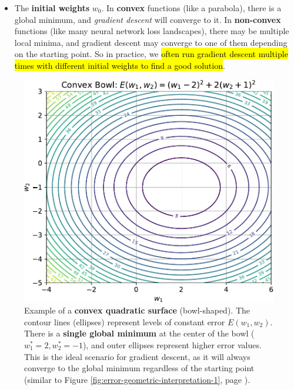 \begin{itemize}
    \item The \textbf{initial weights} $w_{0}$. In \textbf{convex} functions (like a parabola), there is a global minimum, and \emph{gradient descent} will converge to it. In \textbf{non-convex} functions (like many neural network loss landscapes), there may be multiple local minima, and gradient descent may converge to one of them depending on the starting point. So in practice, we \hl{often run gradient descent multiple times with different initial weights to find a good solution}.
\end{itemize}

\begin{figure}[!htp]
    \centering
    \includegraphics[width=.8\textwidth]{img/learning-and-optimization/convex-bowl-contour.pdf}
    \caption{Example of a \textbf{convex quadratic surface} (bowl-shaped). The contour lines (ellipses) represent levels of constant error $E\left(w_{1}, w_{2}\right)$. There is a \textbf{single global minimum} at the center of the bowl ($w_{1}^{*} = 2, w_{2}^{*} = -1$), and outer ellipses represent higher error values. This is the ideal scenario for gradient descent, as it will always converge to the global minimum regardless of the starting point (similar to Figure \ref{fig:error-geometric-interpretation-1}, page \pageref{fig:error-geometric-interpretation-1}).}
    \label{fig:convex-bowl-contour}
\end{figure}


